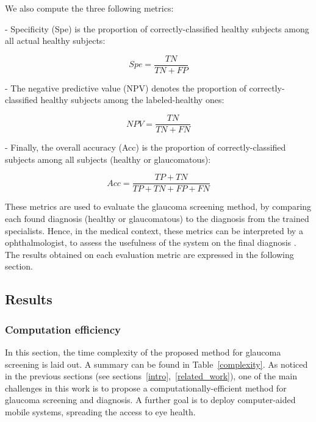 We also compute the three following metrics:

- Specificity (Spe) is the proportion of correctly-classified healthy subjects among all actual healthy subjects:

\begin{equation}
Spe = \frac{TN}{TN+FP}
\label{specificity}
\end{equation}

\bigbreak

- The negative predictive value (NPV) denotes the proportion of correctly-classified healthy subjects among the labeled-healthy ones:

\begin{equation}
NPV = \frac{TN}{TN+FN}
\label{NPV}
\end{equation}

\bigbreak

- Finally, the overall accuracy (Acc) is the proportion of correctly-classified subjects among all subjects (healthy or glaucomatous):

\begin{equation}
Acc = \frac{TP+TN}{TP+TN+FP+FN}
\label{accuracy}
\end{equation}

\bigbreak

These metrics are used to evaluate the glaucoma screening method, by comparing each found diagnosis (healthy or glaucomatous) to the diagnosis from the trained specialists. Hence, in the medical context, these metrics can be interpreted by a ophthalmologist, to assess the usefulness of the system on the final diagnosis \citep{saunders}.
The results obtained on each evaluation metric are expressed in the following section.

\subsection{Results}

\subsubsection{Computation efficiency}

In this section, the time complexity of the proposed method for glaucoma screening is laid out. A summary can be found in \mbox{Table \ref{complexity}}. As noticed in the previous sections (see \mbox{sections \ref{intro}, \ref{related_work}}), one of the main challenges in this work is to propose a computationally-efficient method for glaucoma screening and diagnosis. A further goal is to deploy computer-aided mobile systems, spreading the access to eye health.

